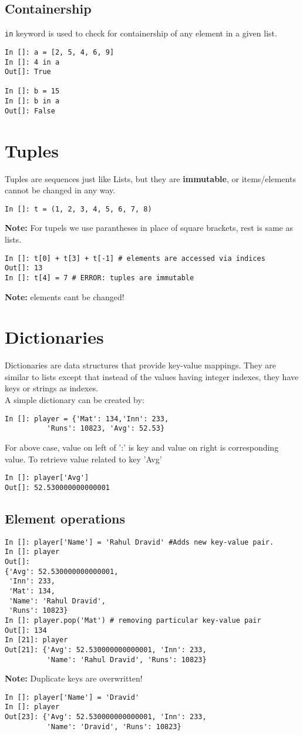 \documentclass[12pt]{article}
\newcommand{\typ}[1]{\lstinline{#1}}
\begin{document}
\subsection{Containership}
\typ{in} keyword is used to check for containership of any element in a given list.
\begin{lstlisting}
In []: a = [2, 5, 4, 6, 9]
In []: 4 in a
Out[]: True

In []: b = 15
In []: b in a
Out[]: False
\end{lstlisting}
\section{Tuples}
Tuples are sequences just like Lists, but they are \textbf{immutable}, or items/elements cannot be changed in any way.
\begin{lstlisting}
In []: t = (1, 2, 3, 4, 5, 6, 7, 8) 
\end{lstlisting}
\textbf{Note:} For tupels we use parantheses in place of square brackets, rest is same as lists.
\begin{lstlisting}
In []: t[0] + t[3] + t[-1] # elements are accessed via indices
Out[]: 13
In []: t[4] = 7 # ERROR: tuples are immutable
\end{lstlisting}
\textbf{Note:} elements cant be changed!
\section{Dictionaries}
Dictionaries are data structures that provide key-value mappings. They are similar to lists except that instead of the values having integer indexes, they have keys or strings as indexes.\\
A simple dictionary can be created by:
\begin{lstlisting}
In []: player = {'Mat': 134,'Inn': 233,
          'Runs': 10823, 'Avg': 52.53}
\end{lstlisting}
For above case, value on left of ':' is key and value on right is corresponding value. To retrieve value related to key 'Avg'
\begin{lstlisting}
In []: player['Avg']
Out[]: 52.530000000000001
\end{lstlisting}
\subsection{Element operations}
\begin{lstlisting}
In []: player['Name'] = 'Rahul Dravid' #Adds new key-value pair.
In []: player
Out[]: 
{'Avg': 52.530000000000001,
 'Inn': 233,
 'Mat': 134,
 'Name': 'Rahul Dravid',
 'Runs': 10823}
In []: player.pop('Mat') # removing particular key-value pair
Out[]: 134
In [21]: player
Out[21]: {'Avg': 52.530000000000001, 'Inn': 233, 
          'Name': 'Rahul Dravid', 'Runs': 10823}
\end{lstlisting}
\textbf{Note:} Duplicate keys are overwritten!\\
\begin{lstlisting}
In []: player['Name'] = 'Dravid'
In []: player
Out[23]: {'Avg': 52.530000000000001, 'Inn': 233, 
          'Name': 'Dravid', 'Runs': 10823}
\end{lstlisting}
\end{document}
